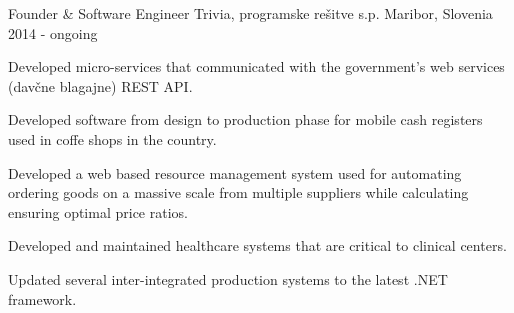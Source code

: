 \begin{cventries}
  \cventry
    {Founder \& Software Engineer} %
    {Trivia, programske rešitve s.p.} %
    {Maribor, Slovenia} %
    {2014 - ongoing} %
    {
      \begin{cvitems} %
        \item {Developed micro-services that communicated with the 
        government's web services (davčne blagajne) REST API.}
        \item {Developed software from design to production phase for 
        mobile cash registers used in coffe shops in the country.}
        \item {Developed a web based resource management system used 
        for automating ordering goods on a massive scale from multiple 
        suppliers while calculating ensuring optimal price ratios.}
        \item {Developed and maintained healthcare systems that are 
        critical to clinical centers. }
        \item {Updated several inter-integrated production systems to the latest .NET framework. }
      \end{cvitems}
    }

\end{cventries}
